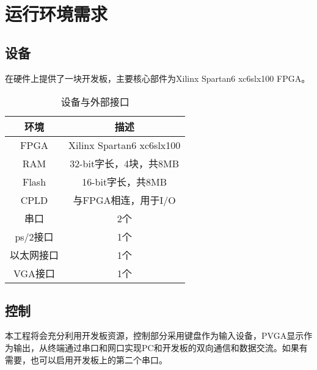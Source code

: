 \section{运行环境需求}
\subsection{设备}
在硬件上提供了一块开发板，主要核心部件为Xilinx Spartan6 xc6slx100 FPGA。
\begin{table}[h]
	\centering
	\caption{设备与外部接口}
	\begin{tabular}{|c|c|}
		\hline
		环境 & 描述 \\
		\hline
		FPGA & Xilinx Spartan6 xc6slx100 \\
		\hline
		RAM & 32-bit字长，4块，共8MB \\
		\hline
		Flash & 16-bit字长，共8MB \\
		\hline
		CPLD & 与FPGA相连，用于I/O \\
		\hline
		串口 & 2个 \\
		\hline
		ps/2接口 & 1个 \\
		\hline
		以太网接口 & 1个 \\
		\hline
		VGA接口 & 1个 \\
		\hline
	\end{tabular}
\end{table}
\subsection{控制}
本工程将会充分利用开发板资源，控制部分采用键盘作为输入设备，PVGA显示作为输出，从终端通过串口和网口实现PC和开发板的双向通信和数据交流。如果有需要，也可以启用开发板上的第二个串口。
